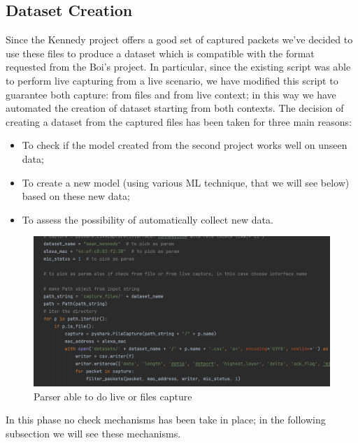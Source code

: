 \documentclass[sigconf]{acmart}
\begin{document}
\subsection{Dataset Creation}
Since the Kennedy project offers a good set of captured packets we've decided to use these files to produce a dataset which is compatible with the format requested from the Boi's project. In particular, since the existing script was able to perform live capturing from a live scenario, we have modified this script to guarantee both capture: from files and from live context; in this way we have automated the creation of dataset starting from both contexts.
The decision of creating a dataset from the captured files has been taken for three main reasons:
\begin{itemize}
\item To check if the model created from the second project works well on unseen data;
\item To create a new model (using various ML technique, that we will see below) based on these new data;
\item To assess the possibility of automatically collect new data.
\end{itemize}
\begin{figure}[h!]
        \includegraphics[width=0.8\linewidth]{img/parser.png}
        \caption{Parser able to do live or files capture}
        \label{fig:parser}
    \end{figure}
In this phase no check mechanisms has been take in place; in the following subsection we will see these mechanisms.
\end{document}
